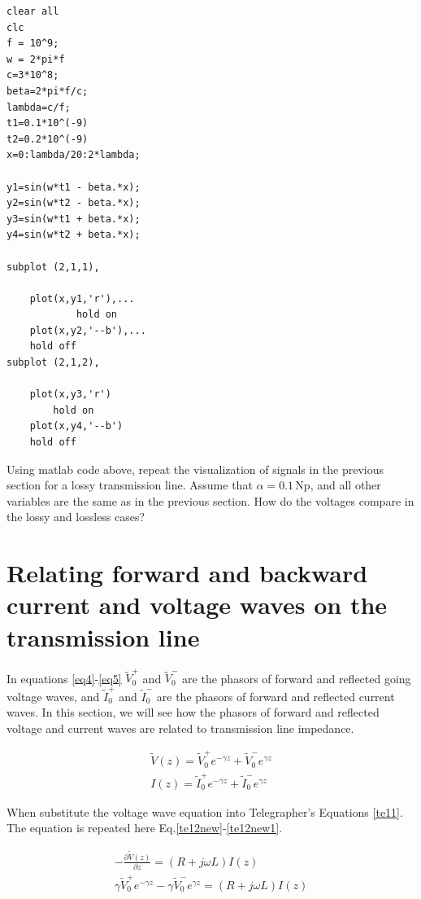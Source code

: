 \documentclass{ximera}
\begin{document}
\begin{verbatim}
clear all
clc
f = 10^9;
w = 2*pi*f
c=3*10^8;
beta=2*pi*f/c;
lambda=c/f;
t1=0.1*10^(-9)
t2=0.2*10^(-9)
x=0:lambda/20:2*lambda;

y1=sin(w*t1 - beta.*x);
y2=sin(w*t2 - beta.*x);
y3=sin(w*t1 + beta.*x);
y4=sin(w*t2 + beta.*x);

subplot (2,1,1),

    plot(x,y1,'r'),...
            hold on
    plot(x,y2,'--b'),...
    hold off
subplot (2,1,2),

    plot(x,y3,'r')
        hold on
    plot(x,y4,'--b')
    hold off
\end{verbatim}

Using matlab code above, repeat the visualization of signals  in the previous section for a lossy transmission line. Assume that $\alpha=0.1$\,Np, and all other variables are the same as in the previous section. How do the voltages compare in the lossy and lossless cases?

\section{Relating forward and backward current and voltage waves on
the transmission line}


In equations \ref{eq4}-\ref{eq5} $\tilde{V}_0^+$ and $\tilde{V}_0^-$ are the phasors of forward and
reflected going voltage waves, and $\tilde{I}_0^+$ and $\tilde{I}_0^-$ are the phasors of forward and
reflected  current waves. In this section, we will see how the phasors of forward and reflected voltage and
current waves are related to transmission line impedance.


\begin{eqnarray}
\tilde{V}(z)=\tilde{V}_0^+ e^{-\gamma z} + \tilde{V}_0^- e^{\gamma z}\label{eq4} \\
I(z)=\tilde{I}_0^+ e^{-\gamma z} + \tilde{I}_0^- e^{\gamma z}\label{eq5}
\end{eqnarray}




When substitute the voltage wave equation into Telegrapher's  Equations
\ref{te11}. The equation is repeated here  Eq.\ref{te12new}-\ref{te12new1}.




\begin{eqnarray}
-\frac{\partial \tilde{V}(z)}{\partial z} = (R+j\omega L) I(z) \label{te12new} \\
\gamma \tilde{V}_0^+ e^{-\gamma z} - \gamma \tilde{V}_0^- e^{\gamma z} = (R+ j \omega
L) I(z) \label{te12new1}
\end{eqnarray}
\end{document}
